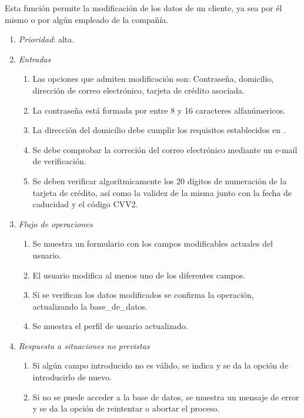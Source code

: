 

 \label{fun:editarcliente}
	Esta función permite la modificación de los datos de un cliente, ya sea por él mismo o por algún empleado de la compañía.

	\begin{enumerate}
		\item \textit{Prioridad}: alta.
		\item \textit{Entradas}
		\begin{enumerate}
			\item Las opciones que admiten modificación son: Contraseña, domicilio, dirección de correo electrónico, tarjeta de crédito asociada.
			\item La contraseña está formada por entre 8 y 16 caracteres alfanúmericos.
			\item La dirección del domicilio debe cumplir los requisitos establecidos en .
			\item Se debe comprobar la correción del correo electrónico mediante un e-mail de verificación.
			\item Se deben verificar algorítmicamente los 20 dígitos de numeración de la tarjeta de crédito, así como la validez de la misma junto con la fecha de caducidad y el código \gls{CVV2}.
		\end{enumerate}
		\item \textit{Flujo de operaciones}
		\begin{enumerate}
			\item Se muestra un formulario con los campos modificables actuales del usuario.
			\item El usuario modifica al menos uno de los diferentes campos.
			\item Si se verifican los datos modificados se confirma la operación, actualizando la \gls{base_de_datos}.
			\item Se muestra el perfil de usuario actualizado.
		\end{enumerate}
		\item \textit{Respuesta a situaciones no previstas}
		\begin{enumerate}
			\item Si algún campo introducido no es válido, se indica y se da la opción de introducirlo de nuevo.
			\item Si no se puede acceder a la base de datos, se muestra un mensaje de error y se da la opción de reintentar o abortar el proceso.
		\end{enumerate}
	\end{enumerate}
